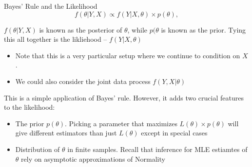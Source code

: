 \documentclass[notes,11pt, aspectratio=169]{beamer}
\newenvironment{wideitemize}{\itemize\addtolength{\itemsep}{10pt}}{\enditemize}
\begin{document}
\begin{frame}{Bayes' Rule and the Likelihood}
      \begin{equation*}
        f(\theta | Y, X) \propto f(Y | X, \theta) \times p(\theta),
      \end{equation*}
  \begin{wideitemize}
  \item $f(\theta | Y, X)$ is known as the posterior of $\theta$,
    while $p(\theta$ is known as the prior. Tying this all together is
    the likliehood -- $f(Y|X, \theta)$
    \begin{itemize}
    \item Note that this is a very particular setup where we continue to condition on $X$.
    \item We could also consider the joint data process $f(Y, X | \theta)$
    \end{itemize}
  \item This is a simple application of Bayes' rule. However, it adds
    two crucial features to the likelihood:
    \begin{itemize}
    \item The prior $p(\theta)$. Picking a parameter that maximizes
      $L(\theta) \times p(\theta)$ will give different estimators than
      just $L(\theta)$ except in special cases
    \item Distribution of $\theta$ in finite samples. Recall that
      inference for MLE estiamtes of $\theta$ rely on asymptotic
      approximations of Normality
    \end{itemize}
  \end{wideitemize}
\end{frame}
\end{document}
